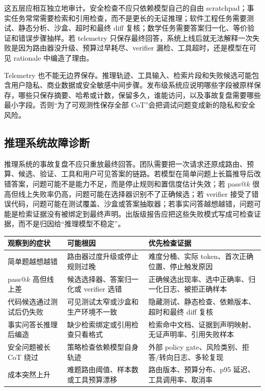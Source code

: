 \documentclass[UTF8,zihao=-4,openany]{ctexbook}
\begin{document}
这五层应相互独立地审计。安全检查不应只依赖模型自己的自由 scratchpad；事实任务常常需要检索和引用检查，而不是更长的无证推理；软件工程任务需要测试、静态分析、沙盒、超时和最终 diff 复核；数学任务需要答案归一化、等价验证和错误步骤抽样。若 telemetry 只保存最终回答，系统上线后就无法解释一次失败是因为路由器没升级、预算过早耗尽、verifier 漏检、工具超时，还是模型在可见 rationale 中编造了理由。

Telemetry 也不能无边界保存。推理轨迹、工具输入、检索片段和失败候选可能包含用户隐私、商业数据或安全敏感中间步骤。发布级系统应说明哪些字段被原样保存，哪些只保存摘要、哈希或计数，保留多久，谁能访问，以及事故复盘需要哪些最小字段。否则“为了可观测性保存全部 CoT”会把调试问题变成新的隐私和安全风险。

\subsection{推理系统故障诊断}
推理系统的事故复盘不应只重放最终回答。团队需要把一次请求还原成路由、预算、候选、验证、工具和用户可见答案的链路。若模型在简单问题上长篇推导后改错答案，问题可能不是能力不足，而是停止规则和置信度估计失效；若 pass@$k$ 很高但线上失败率仍高，问题可能在选择器识别不了正确候选；若 verifier 接受了错误代码，问题可能在测试覆盖、沙盒或答案抽取器；若事实问答越想越错，问题可能是检索证据没有被绑定到最终声明。出版级报告应把这些失败模式写成可检查证据，而不是归因给“推理模型不稳定”。

\begin{center}
\small
\begin{tabular}{@{}p{}p{}p{}@{}}
\toprule
观察到的症状 & 可能根因 & 优先检查证据 \\
\midrule
简单题越想越错 & 路由器过度升级或停止规则过晚 & 难度分桶、实际 token、首次正确位置、停止触发原因 \\
pass@$k$ 高但线上差 & 候选选择器、答案归一化或 verifier 选错 & 正确候选出现率、选中正确率、归一化日志、被拒正确样本 \\
代码候选通过测试后仍失败 & 可见测试太窄或沙盒和生产环境不一致 & 隐藏测试、静态检查、依赖版本、超时和最终 diff 复核 \\
事实问答长推理后编造 & 缺少检索绑定或引用检查只看格式 & 检索命中文档、证据到声明映射、无证声明率、引用失败样本 \\
安全问题被长 CoT 绕过 & 策略检查依赖模型自身轨迹 & 外部 policy gate、风险类别、拒答/转向日志、多轮复现 \\
成本突然上升 & 难题路由阈值、样本数或工具预算漂移 & 路由版本、预算分布、p95 延迟、工具调用率、取消率 \\
\bottomrule
\end{tabular}
\end{center}
\end{document}
